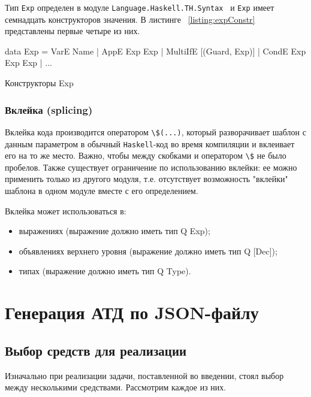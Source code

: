 Тип \lstinline{Exp} определен в модуле \lstinline{Language.Haskell.TH.Syntax}~\cite{coverHaskell} и  \lstinline{Exp} имеет семнадцать конструкторов значения. В листинге ~\ref{listing:expConstr} представлены первые четыре из них.  

\begin{ListingEnv}[H]
\begin{Verb}
data Exp
       = VarE Name
       | AppE Exp Exp
       | MultiIfE [(Guard, Exp)]
       | CondE Exp Exp Exp
       | ...
\end{Verb}
\caption{Конструкторы Exp}
\label{listing:expConstr}
\end{ListingEnv}

\subsection{Вклейка (splicing)}

Вклейка кода производится оператором  \lstinline{\$(...)}, который разворачивает шаблон с данным параметром в обычный \lstinline{Haskell}-код во время компиляции и вклеивает его на то же место. Важно, чтобы между скобками и оператором \lstinline{\$} не было пробелов. Также существует ограничение по использованию вклейки: ее можно применить только из другого модуля, т.е. отсутствует возможность "вклейки" шаблона в одном модуле вместе с его определением.

Вклейка может использоваться в:

\begin{itemize}
  \item выражениях (выражение должно иметь тип Q Exp);
  \item объявлениях верхнего уровня (выражение должно иметь тип Q [Dec]);
  \item типах (выражение должно иметь тип Q Type).
\end{itemize}

\chapter{Генерация АТД по JSON-файлу}

\section{Выбор средств для реализации}

Изначально при реализации задачи, поставленной во введении, стоял выбор между несколькими средствами. Рассмотрим каждое из них.

